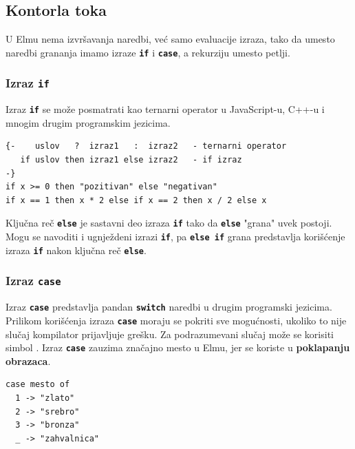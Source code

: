 \documentclass[12pt,oneside]{memoir}
\begin{document}
\subsection{Kontorla toka}
U Elmu nema izvršavanja naredbi, već samo evaluacije izraza, tako da umesto naredbi grananja
imamo izraze \texttt{\textbf{if}} i \texttt{\textbf{case}}, a rekurziju umesto petlji.  
\subsubsection{Izraz \texttt{\textbf{if}}}
Izraz \texttt{\textbf{if}} se može posmatrati kao ternarni operator u JavaScript-u, C++-u i 
mnogim drugim programskim jezicima.
\begin{listing}[h]
\begin{verbatim}
{-    uslov   ?  izraz1   :  izraz2   - ternarni operator
   if uslov then izraz1 else izraz2   - if izraz
-}
if x >= 0 then "pozitivan" else "negativan"
if x == 1 then x * 2 else if x == 2 then x / 2 else x
\end{verbatim}
\caption{Sintaksa izraz \texttt{\textbf{if}} i primer upotrebe}
\label{listing:if}
\end{listing}

Ključna reč \texttt{\textbf{else}} je sastavni deo izraza \texttt{\textbf{if}} tako
da \texttt{\textbf{else}} "grana" uvek postoji. Mogu se navoditi i ugnježdeni
izrazi \texttt{\textbf{if}}, pa \texttt{\textbf{else if}} grana predstavlja korišćenje
izraza \texttt{\textbf{if}} nakon ključna reč \texttt{\textbf{else}}.

\subsubsection{Izraz \texttt{\textbf{case}}}
Izraz \texttt{\textbf{case}} predstavlja pandan \texttt{\textbf{switch}} naredbi u drugim
programski jezicima. Prilikom korišćenja izraza \texttt{\textbf{case}} moraju se pokriti sve
mogućnosti, ukoliko to nije slučaj kompilator prijavljuje grešku. Za podrazumevani slučaj
može se korisiti simbol \texttt{\textbf{\textunderscore}}. Izraz \texttt{\textbf{case}}
zauzima značajno mesto u Elmu, jer se koriste u \textbf{poklapanju obrazaca}.
\begin{listing}[h]
\begin{verbatim}
case mesto of
  1 -> "zlato"
  2 -> "srebro"
  3 -> "bronza"
  _ -> "zahvalnica"
\end{verbatim}
\caption{Primer upotrebe izraza \texttt{\textbf{case}}}
\label{listing:case}
\end{listing}
\end{document}
